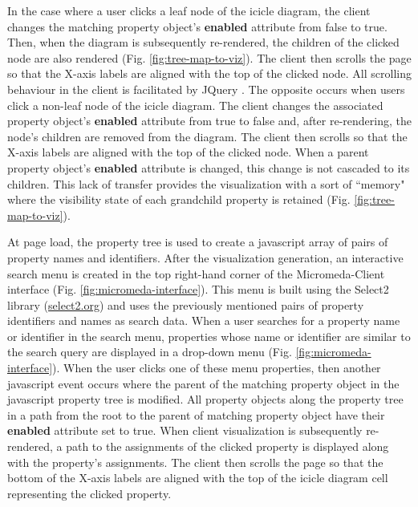 In the case where a user clicks a leaf node of the icicle diagram, the client 
changes the matching property object's \textbf{enabled} attribute from false to 
true. Then, when the diagram is subsequently re-rendered, the children of the 
clicked node are also rendered (Fig. \ref{fig:tree-map-to-viz}). The client then 
scrolls the page so that the X-axis labels are aligned with the top of the 
clicked node. All scrolling behaviour in the client is facilitated by JQuery 
\cite{li2012jquery}. The opposite occurs when users click a non-leaf node of the 
icicle diagram. The client changes the associated property object's 
\textbf{enabled} attribute from true to false and, after re-rendering, the 
node's children are removed from the diagram. The client then scrolls so that 
the X-axis labels are aligned with the top of the clicked node. When a parent 
property object's \textbf{enabled} attribute is changed, this change is not 
cascaded to its children. This lack of transfer provides the visualization with 
a sort of ``memory" where the visibility state of each grandchild property is 
retained (Fig. \ref{fig:tree-map-to-viz}).

At page load, the property tree is used to create a \gls{javascript} array of 
pairs of property names and identifiers. After the visualization generation, an 
interactive search menu is created in the top right-hand corner of the 
Micromeda-Client interface (Fig. \ref{fig:micromeda-interface}). This menu is 
built using the Select2 library \cite{select2} 
(\href{http://select2.org}{select2.org}) and uses the previously mentioned pairs 
of property identifiers and names as search data. When a user searches for a 
property name or identifier in the search menu, properties whose name or 
identifier are similar to the search query are displayed in a drop-down menu 
(Fig. \ref{fig:micromeda-interface}). When the user clicks one of these menu 
properties, then another \gls{javascript} event occurs where the parent of the 
matching property object in the \gls{javascript} property tree is modified. All 
property objects along the property tree in a path from the root to the parent 
of matching property object have their \textbf{enabled} attribute set to true. 
When client visualization is subsequently re-rendered, a path to the assignments 
of the clicked property is displayed along with the property's assignments. The 
client then scrolls the page so that the bottom of the X-axis labels are aligned 
with the top of the icicle diagram cell representing the clicked property.

